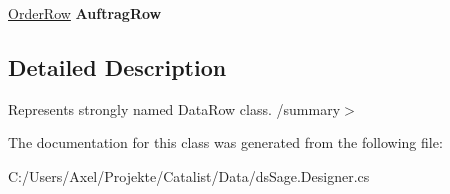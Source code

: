 \begin{DoxyCompactItemize}
\item 
\hyperlink{class_products_1_1_data_1_1ds_sage_1_1_order_row}{Order\+Row} {\bfseries Auftrag\+Row}\hypertarget{class_products_1_1_data_1_1ds_sage_1_1_order_detail_row_aa487b37d76cc1b6a7791de40e70b9fd9}{}\label{class_products_1_1_data_1_1ds_sage_1_1_order_detail_row_aa487b37d76cc1b6a7791de40e70b9fd9}

\end{DoxyCompactItemize}


\subsection{Detailed Description}
Represents strongly named Data\+Row class. /summary$>$ 

The documentation for this class was generated from the following file\+:\begin{DoxyCompactItemize}
\item 
C\+:/\+Users/\+Axel/\+Projekte/\+Catalist/\+Data/ds\+Sage.\+Designer.\+cs\end{DoxyCompactItemize}
